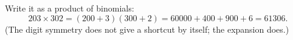 Write it as a product of binomials:
\[
203\times302=(200+3)(300+2)=60000+400+900+6=\boxed{61306}.
\]
(The digit symmetry does not give a shortcut by itself; the expansion does.)
